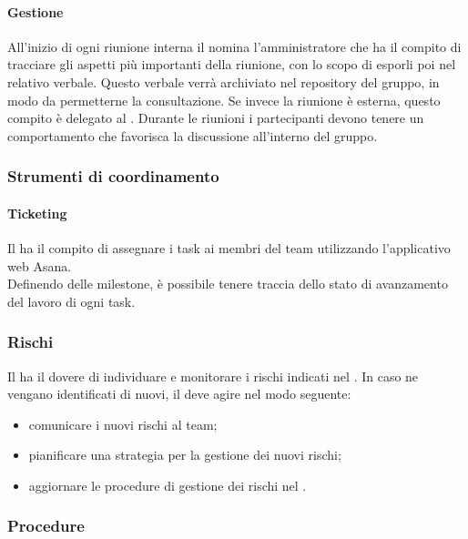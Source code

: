  \paragraph{Gestione}
 All’inizio di ogni riunione interna il \RESP{} nomina l'amministratore che ha il compito di tracciare gli aspetti più importanti della riunione, con lo scopo di esporli poi nel relativo verbale. Questo verbale verrà archiviato nel repository del gruppo, in modo da permetterne la consultazione. Se invece la riunione è esterna, questo compito è delegato al \RESP{}.
 Durante le riunioni i partecipanti devono tenere un comportamento che favorisca la discussione all’interno del gruppo.
 
\subsubsection{Strumenti di coordinamento}
 \paragraph{Ticketing}
 Il \RESP{} ha il compito di assegnare i task ai membri del team utilizzando l'applicativo web Asana. \\
 Definendo delle milestone, è possibile tenere traccia dello stato di avanzamento del lavoro di ogni task.
 
 \subsubsection{Rischi}
 Il \RESP{} ha il dovere di individuare e monitorare i rischi indicati nel \PPdoc. In caso ne vengano identificati di nuovi, il \RESP{} deve agire nel modo seguente:
 \begin{itemize}
  \item comunicare i nuovi rischi al team;
  \item pianificare una strategia per la gestione dei nuovi rischi;
  \item aggiornare le procedure di gestione dei rischi nel \PPdoc.
 \end{itemize}
 \subsubsection{Procedure}
